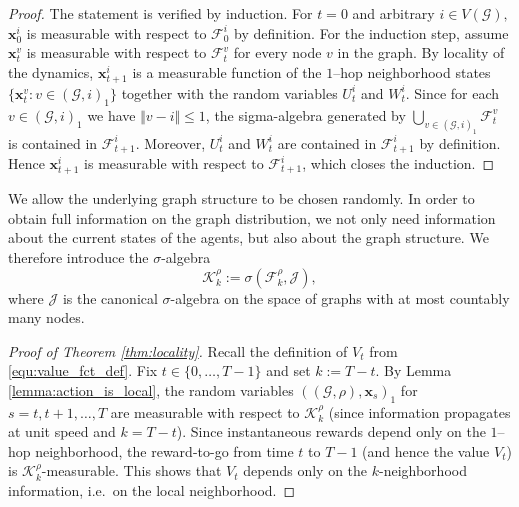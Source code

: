 \documentclass{article}
\begin{document}
\begin{proof}
    The statement is verified by induction. For $t=0$ and arbitrary $i \in V(\mathcal G),$ $\mathbf x_0 ^i$ is measurable with respect to $\mathcal F_{0} ^i$ by definition.
    For the induction step, assume $\mathbf x_{t}^v$ is measurable with respect to $\mathcal F^{v} _{t}$ for every node $v$ in the graph.
    By locality of the dynamics, $\mathbf x_{t+1}^i$ is a measurable function of the $1$--hop neighborhood states $\{\mathbf x_t^v : v \in (\mathcal G, i)_1\}$ together with the random variables $U_t^i$ and $W_t^i$.
    Since for each $v \in (\mathcal G,i)_1$ we have $\Vert v-i\Vert \le 1$, the sigma-algebra generated by $\bigcup_{v\in(\mathcal G,i)_1}\mathcal F_t^v$ is contained in $\mathcal F_{t+1}^i$.
    Moreover, $U_t^i$ and $W_t^i$ are contained in $\mathcal F_{t+1}^i$ by definition. Hence $\mathbf x_{t+1}^i$ is measurable with respect to $\mathcal F_{t+1}^i$, which closes the induction.
\end{proof}

We allow the underlying graph structure to be chosen randomly. In order to obtain full information on the graph distribution, we not only need information about the current states of the agents, but also about the graph structure. We therefore introduce the $\sigma$-algebra
$$\mathcal K ^ \rho _ k := \sigma \left( \mathcal F_k ^\rho , \mathcal J \right),$$
where $\mathcal J$ is the canonical $\sigma$-algebra on the space of graphs with at most countably many nodes.

\begin{proof}[Proof of Theorem \ref{thm:locality}]
    Recall the definition of $V_t$ from \eqref{equ:value_fct_def}. Fix $t\in\{0,\dots,T-1\}$ and set $k:=T-t$.
    By Lemma \ref{lemma:action_is_local}, the random variables $( (\mathcal G,\rho),\mathbf x_s )_1$ for $s=t,t+1,\dots,T$ are measurable with respect to $\mathcal K _k ^\rho$ (since information propagates at unit speed and $k=T-t$).
    Since instantaneous rewards depend only on the $1$--hop neighborhood, the reward-to-go from time $t$ to $T-1$ (and hence the value $V_t$) is $\mathcal K_k^\rho$-measurable. This shows that $V_t$ depends only on the $k$-neighborhood information, i.e.\ on the local neighborhood.
\end{proof}
\end{document}
